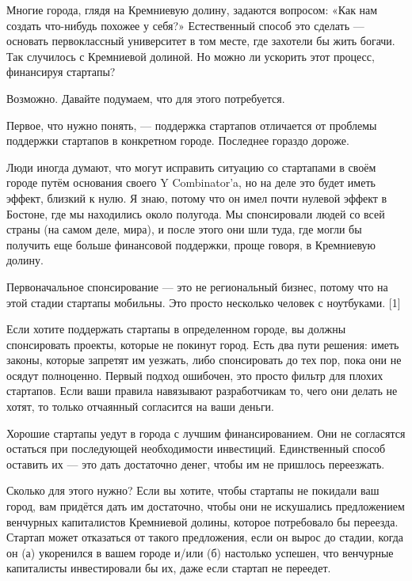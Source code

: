 \documentclass[ebook,12pt,oneside,openany]{memoir}
\author{Пол Грэм} \date{}
\begin{document}
\maketitle

Многие города, глядя на Кремниевую долину, задаются вопросом: «Как нам
создать что-нибудь похожее у себя?» Естественный способ это сделать —
основать первоклассный университет в том месте, где захотели бы жить
богачи. Так случилось с Кремниевой долиной. Но можно ли ускорить этот
процесс, финансируя стартапы?

Возможно. Давайте подумаем, что для этого потребуется.

Первое, что нужно понять, — поддержка стартапов отличается от проблемы
поддержки стартапов в конкретном городе. Последнее гораздо дороже.

Люди иногда думают, что могут исправить ситуацию со стартапами в своём
городе путём основания своего Y Combinator'a, но на деле это будет
иметь эффект, близкий к нулю. Я знаю, потому что он имел почти нулевой
эффект в Бостоне, где мы находились около полугода. Мы спонсировали
людей со всей страны (на самом деле, мира), и после этого они шли
туда, где могли бы получить еще больше финансовой поддержки, проще
говоря, в Кремниевую долину.

Первоначальное спонсирование — это не региональный бизнес, потому что
на этой стадии стартапы мобильны. Это просто несколько человек с
ноутбуками. [1]

Если хотите поддержать стартапы в определенном городе, вы должны
спонсировать проекты, которые не покинут город. Есть два пути решения:
иметь законы, которые запретят им уезжать, либо спонсировать до тех
пор, пока они не осядут полноценно. Первый подход ошибочен, это просто
фильтр для плохих стартапов. Если ваши правила навязывают
разработчикам то, чего они делать не хотят, то только отчаянный
согласится на ваши деньги.

Хорошие стартапы уедут в города с лучшим финансированием. Они не
согласятся остаться при последующей необходимости инвестиций.
Единственный способ оставить их — это дать достаточно денег, чтобы им
не пришлось переезжать.

Сколько для этого нужно? Если вы хотите, чтобы стартапы не покидали
ваш город, вам придётся дать им достаточно, чтобы они не искушались
предложением венчурных капиталистов Кремниевой долины, которое
потребовало бы переезда. Стартап может отказаться от такого
предложения, если он вырос до стадии, когда он (а) укоренился в вашем
городе и/или (б) настолько успешен, что венчурные капиталисты
инвестировали бы их, даже если стартап не переедет.
\end{document}
